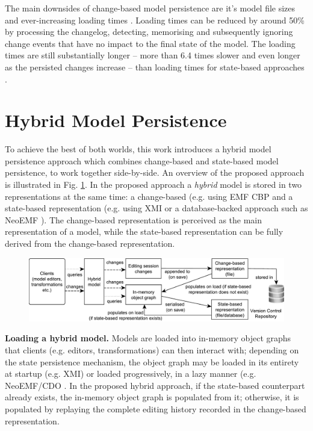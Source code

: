 The main downsides of change-based model persistence are it's model file sizes \cite{DBLP:journals/entcs/RobbesL07,DBLP:conf/edoc/KoegelHLHD10} and ever-increasing loading times \cite{mens2002state}. Loading times can be reduced by around 50\% by processing the changelog, detecting, memorising and subsequently ignoring change events that have no impact to the final state of the model. The loading times are still substantially longer -- more than 6.4 times slower and even longer as the persisted changes increase -- than loading times for state-based approaches \cite{yohannis2018towards}. 

\section{Hybrid Model Persistence}
\label{sec:hybrid_model_persistence}
To achieve the best of both worlds, this work introduces a hybrid model persistence approach which combines change-based and state-based model persistence, to work together side-by-side. An overview of the proposed approach is illustrated in Fig. \ref{fig:hybrid_persistence}. In the proposed approach a \textit{hybrid} model is stored in two representations at the same time: a change-based (e.g. using EMF CBP \cite{epsilonlabs2019emfcbp} and a state-based representation (e.g. using XMI \cite{omg2018xmi} or a database-backed approach such as NeoEMF \cite{daniel2016neoemf}). The change-based representation is perceived as the main representation of a model, while the state-based representation can be fully derived from the change-based representation.

\begin{figure}[t]
  \includegraphics[width=\linewidth]{images/hybrid_persistence}
  \label{fig:hybrid_persistence}
\end{figure}

\textbf{Loading a hybrid model.} Models are loaded into in-memory object graphs that clients (e.g. editors, transformations) can then interact with; depending on the state persistence mechanism, the object graph may be loaded in its entirety at startup (e.g. XMI) or loaded progressively, in a lazy manner (e.g. NeoEMF/CDO \cite{daniel2016neoemf,eclipse2019cdo}. In the proposed hybrid approach, if the state-based counterpart already exists, the in-memory object graph is populated from it; otherwise, it is populated by replaying the complete editing history recorded in the change-based representation.

